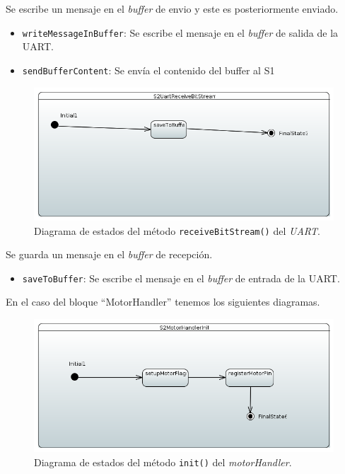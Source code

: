 Se escribe un mensaje en el \textit{buffer} de envio y este es posteriormente enviado.

\begin{itemize}
    \item \texttt{writeMessageInBuffer}: Se escribe el mensaje en el \textit{buffer} de salida de la UART.
    \item \texttt{sendBufferContent}: Se envía el contenido del buffer al \ac{S1}
\end{itemize}

\begin{figure}[H]
    \centering
    \includegraphics[width=1\linewidth]{pictures/S2UartReceiveBitStream.PNG}
    \caption{Diagrama de estados del método \texttt{receiveBitStream()} del \textit{UART}.}
    \label{fig:fun_receive_bit_stream_uart}
\end{figure}

Se guarda un mensaje en el \textit{buffer} de recepción.

\begin{itemize}
    \item \texttt{saveToBuffer}: Se escribe el mensaje en el \textit{buffer} de entrada de la UART.
\end{itemize}


En el caso del bloque “MotorHandler” tenemos los siguientes diagramas.

\begin{figure}[H]
    \centering
    \includegraphics[width=1\linewidth]{pictures/S2MotorHandlerInit.PNG}
    \caption{Diagrama de estados del método \texttt{init()} del \textit{motorHandler}.}
    \label{fig:fun_init_motor_handler}
\end{figure}

